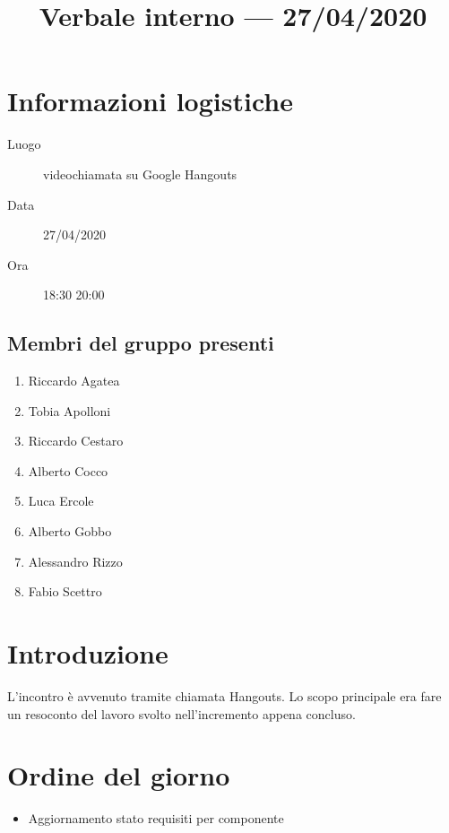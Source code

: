 \documentclass{article}
\title{Verbale interno --- 27/04/2020}
\begin{document}


\section{Informazioni logistiche}%
\label{sec:informazioni_logistiche}

\begin{description}
  \item [Luogo] videochiamata su Google Hangouts
  \item [Data] 27/04/2020
  \item [Ora] 18:30  20:00
\end{description}

\subsection{Membri del gruppo presenti}%
\label{sub:membri_del_gruppo_presenti}

\begin{enumerate}
  \item Riccardo Agatea
  \item Tobia Apolloni
  \item Riccardo Cestaro
  \item Alberto Cocco
  \item Luca Ercole
  \item Alberto Gobbo
  \item Alessandro Rizzo
  \item Fabio Scettro
\end{enumerate}

\section{Introduzione}%
\label{sec:introduzione}
L'incontro è avvenuto tramite chiamata Hangouts.
Lo scopo principale era fare un resoconto del lavoro svolto nell'incremento appena concluso.

\section{Ordine del giorno}%
\label{sec:ordine_del_giorno}

\begin{itemize}
  \item Aggiornamento stato requisiti per componente
\end{itemize}
\end{document}
